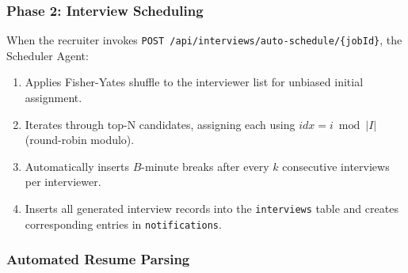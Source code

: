 \documentclass[conference]{IEEEtran}
\begin{document}
\subsubsection{Phase 2: Interview Scheduling}

When the recruiter invokes \texttt{POST /api/interviews/auto-schedule/\{jobId\}}, the Scheduler Agent:

\begin{enumerate}
    \item Applies Fisher-Yates shuffle to the interviewer list for unbiased initial assignment.
    \item Iterates through top-N candidates, assigning each using $idx = i \bmod |I|$ (round-robin modulo).
    \item Automatically inserts $B$-minute breaks after every $k$ consecutive interviews per interviewer.
    \item Inserts all generated interview records into the \texttt{interviews} table and creates corresponding entries in \texttt{notifications}.
\end{enumerate}

\begin{table}[htbp]
\caption{Core API Endpoints and Responsible Agents}
\label{tab:api_endpoints}
\begin{center}
\end{center}
\end{table}


\subsubsection{Automated Resume Parsing}
\end{document}
